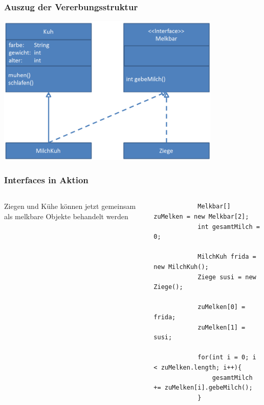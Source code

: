 \begin{frame}[fragile]
	\frametitle{Auszug der Vererbungsstruktur}
		\begin{center}
			\includegraphics[width=0.8\textwidth,
			keepaspectratio=true]{bilder/milchkuh.png}
		\end{center}
\end{frame}

\begin{frame}[fragile]
	\frametitle{Interfaces in Aktion}
	\begin{columns}
	\begin{column}{0.5\textwidth}
		  Ziegen und K\"uhe k\"onnen jetzt
		  gemeinsam als melkbare Objekte behandelt
		  werden
	\end{column}
	\begin{column}{0.5\textwidth}
		\begin{lstlisting}
			Melkbar[] zuMelken = new Melkbar[2];
			int gesamtMilch = 0;
			
			MilchKuh frida = new MilchKuh();
			Ziege susi = new Ziege();
			
			zuMelken[0] = frida;
			zuMelken[1] = susi;
			
			for(int i = 0; i < zuMelken.length; i++){
				gesamtMilch += zuMelken[i].gebeMilch();
			}
		\end{lstlisting}
	\end{column}
	\end{columns}
\end{frame}

